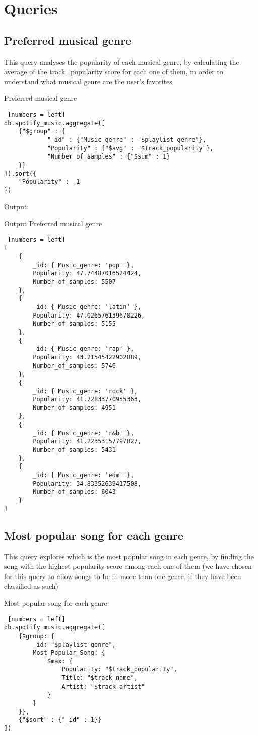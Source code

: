 \documentclass{Configuration_Files/PoliMi3i_thesis}
\begin{document}
\section*{Queries}
\subsection{Preferred musical genre}
This query analyses the popularity of each musical genre, by calculating the average of the track\_popularity score for each one of them, in order to understand what musical genre are the user's favorites\\

\begin{algorithm}[ht]
\caption{Preferred musical genre}
\begin{lstlisting} [numbers = left]
db.spotify_music.aggregate([
	{"$group" : {
			"_id" : {"Music_genre" : "$playlist_genre"},
			"Popularity" : {"$avg" : "$track_popularity"},
			"Number_of_samples" : {"$sum" : 1}
	}}
]).sort({
	"Popularity" : -1
})
\end{lstlisting}
\end{algorithm}
\newpage

Output:
\begin{algorithm}[h!]
\caption{Output Preferred musical genre}
\begin{lstlisting} [numbers = left]
[
	{
		_id: { Music_genre: 'pop' },
		Popularity: 47.74487016524424,
		Number_of_samples: 5507
	},
	{
		_id: { Music_genre: 'latin' },
		Popularity: 47.026576139670226,
		Number_of_samples: 5155
	},
	{
		_id: { Music_genre: 'rap' },
		Popularity: 43.21545422902889,
		Number_of_samples: 5746
	},
	{
		_id: { Music_genre: 'rock' },
		Popularity: 41.72833770955363,
		Number_of_samples: 4951
	},
	{
		_id: { Music_genre: 'r&b' },
		Popularity: 41.22353157797827,
		Number_of_samples: 5431
	},
	{
		_id: { Music_genre: 'edm' },
		Popularity: 34.83352639417508,
		Number_of_samples: 6043
	}
]
\end{lstlisting}
\end{algorithm}
\newpage

\subsection{Most popular song for each genre}
This query explores which is the most popular song in each genre, by finding the song with the highest popularity score among each one of them (we have chosen for this query to allow songs to be in more than one genre, if they have been classified as such)\\
\begin{algorithm}[ht]
\caption{Most popular song for each genre}
\begin{lstlisting} [numbers = left]
db.spotify_music.aggregate([
	{$group: {
		_id: "$playlist_genre",
		Most_Popular_Song: {
			$max: {
				Popularity: "$track_popularity",
				Title: "$track_name",
				Artist: "$track_artist"
			}
		}
	}},
	{"$sort" : {"_id" : 1}}
])
\end{lstlisting}
\end{algorithm}
\newpage
\end{document}
